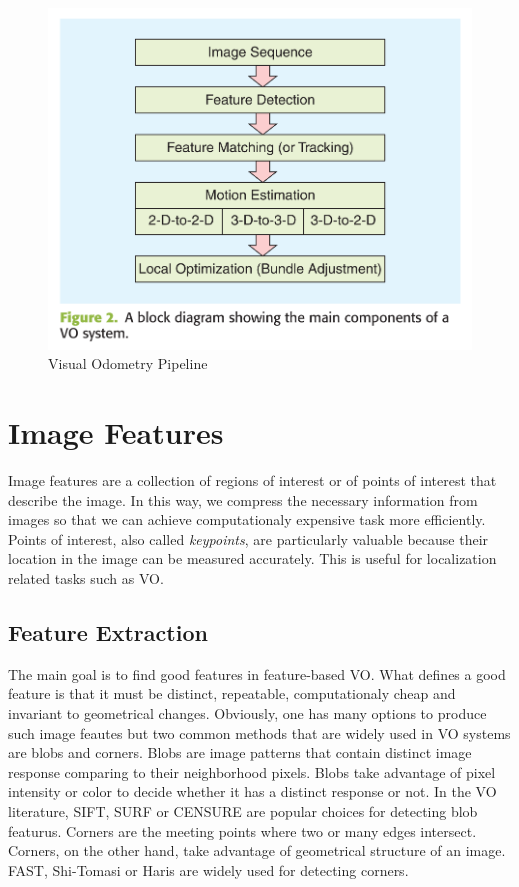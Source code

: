 \documentclass[a4paper]{report}
\numberwithin{figure}{section}
\begin{document}
\begin{figure}[H]
	\centering
	\includegraphics[width=\linewidth,natwidth=640,natheight=640]
  {fig/ref_imgs/vo_pipeline.png}
  \caption{Visual Odometry Pipeline}
	\label{fig:visual_odometry_pipeline}
\end{figure}



\section{Image Features} \label{sc_img_features}

Image features are a collection of regions of interest or of points of interest 
that describe the image. In this way, we compress the necessary information 
from images so that we can achieve computationaly expensive task more efficiently.
Points of interest, also called \textit{keypoints}, 
are particularly valuable because their location in the image can be 
measured accurately. This is useful for localization related tasks such as VO. 

\subsection{Feature Extraction} \label{sb_sc_feature_extraction}

The main goal is to find good features in feature-based VO. 
What defines a good feature is that it must be distinct, 
repeatable, computationaly cheap and invariant to geometrical changes. 
Obviously, one has many options to produce such image 
feautes but two common methods that are widely used in VO systems are 
blobs and corners. 
Blobs are image patterns that contain distinct image response comparing to their 
neighborhood pixels. Blobs take advantage of pixel intensity or color to 
decide whether it has a distinct response or not.
In the VO literature, SIFT\cite{}, SURF\cite{} or CENSURE\cite{} are popular 
choices for detecting blob featurus.
Corners are the meeting points where two or many edges intersect. Corners, 
on the other hand, 
take advantage of geometrical structure of an image. FAST\cite{}, Shi-Tomasi or 
Haris\cite{} are widely used for detecting corners.
\end{document}
